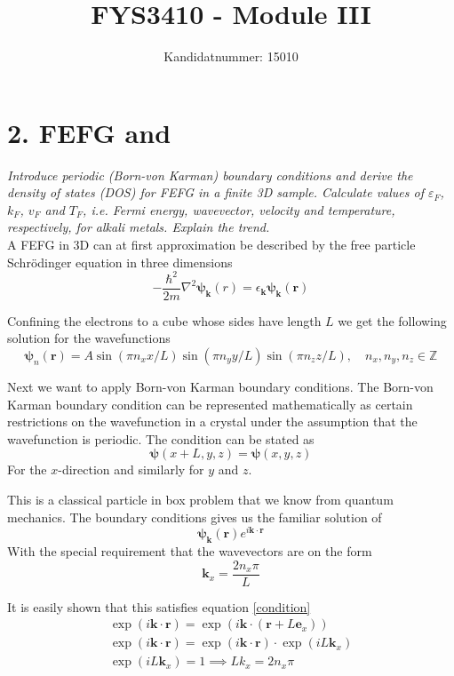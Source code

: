 \documentclass{article}
\author{Kandidatnummer: 15010}
\title{FYS3410 - Module III}
\begin{document}
\maketitle

\section*{2. FEFG and }
\emph{Introduce periodic (Born-von Karman) boundary conditions and derive the density of states (DOS) for FEFG in a finite 3D sample. Calculate values of $\varepsilon_F$, $k_F$, $v_F$ and $T_F$, i.e. Fermi energy, wavevector, velocity and temperature, respectively, for alkali metals. Explain the trend.}\\

A FEFG in 3D can at first approximation be described by the free particle Schrödinger equation in three dimensions
\begin{equation}
	-\frac{\hbar^2}{2m} \nabla^2 \bm{\psi_k}(r) = \epsilon_{\bm{k}}\bm{\psi_k}(\bm{r})
	\label{SE}
\end{equation}

Confining the electrons to a cube whose sides have length $L$ we get the following solution for the wavefunctions
\begin{equation}
	\bm{\psi}_n(\bm{r}) = A\sin(\pi n_xx/L)\sin(\pi n_yy/L)\sin(\pi n_zz/L), \quad n_x,n_y,n_z \in \mathbb{Z}
\end{equation}

Next we want to apply Born-von Karman boundary conditions. The Born-von Karman boundary condition can be represented mathematically as certain restrictions on the wavefunction in a crystal under the assumption that the wavefunction is periodic. The condition can be stated as
	\begin{equation}
		\bm{\psi}(x+L,y,z)=\bm{\psi}(x,y,z)
		\label{condition} 
	\end{equation}
For the $x$-direction and similarly for $y$ and $z$.

This is a classical particle in box problem that we know from quantum mechanics. The boundary conditions gives us the familiar solution of
\begin{equation}
	\bm{\psi_k}(\bm{r})e^{i\bm{k}\cdot\bm{r}}
	\label{pwave}
\end{equation}
With the special requirement that the wavevectors are on the form
$$ \bm{k}_x = \frac{2n_x\pi}{L} $$

It is easily shown that this satisfies equation \eqref{condition}
\begin{align*}
	\exp(i\bm{k}\cdot\bm{r}) = \exp(i\bm{k}\cdot(\bm{r}+L\bm{e}_x))\\
	\exp(i\bm{k}\cdot\bm{r}) = \exp(i\bm{k}\cdot\bm{r}) \cdot \exp(iL\bm k_x)\\
	\exp(iL\bm k_x) = 1 \implies Lk_x = 2n_x\pi
\end{align*}
\end{document}
